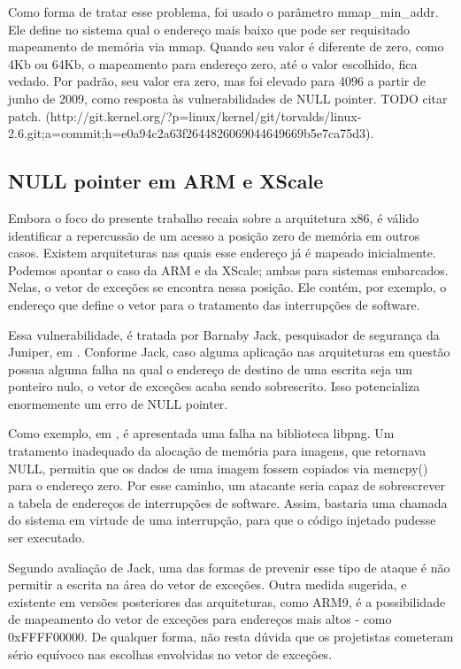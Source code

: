 			Como forma de tratar esse problema, foi usado o parâmetro mmap\_min\_addr.
			Ele define no sistema qual o endereço mais baixo que pode ser requisitado mapeamento
			de memória via mmap. Quando seu valor é diferente de zero, como 4Kb ou 64Kb,
			o mapeamento para endereço zero, até o valor escolhido, fica vedado.
			Por padrão, seu valor era zero, mas foi elevado para 4096 a partir de junho de 2009,
			como resposta às vulnerabilidades de NULL pointer.
			TODO citar patch.
	(http://git.kernel.org/?p=linux/kernel/git/torvalds/linux-2.6.git;a=commit;h=e0a94c2a63f2644826069044649669b5e7ca75d3). 
			
			
		\subsection{NULL pointer em ARM e XScale}
		\label{subsec:null_pointer_arm_xscale}
			Embora o foco do presente trabalho recaia sobre a arquitetura x86, é válido 
			identificar a repercussão de um acesso a posição zero de memória em outros casos.
			Existem arquiteturas nas quais esse endereço já é mapeado inicialmente. 
			Podemos apontar o caso da ARM e da XScale; ambas para sistemas embarcados. 
			Nelas, o vetor de exceções se encontra nessa posição. Ele contém, por exemplo,
			o endereço que define o vetor para o tratamento das interrupções de software.


			Essa vulnerabilidade, é tratada por Barnaby Jack, pesquisador de segurança da Juniper,
			em \cite{Jack2007}. Conforme Jack, caso alguma aplicação nas arquiteturas em questão
			possua alguma falha na qual o endereço de destino de uma escrita seja um ponteiro nulo,
			o vetor de exceções acaba sendo sobrescrito. Isso potencializa enormemente um erro
			de NULL pointer.


			Como exemplo, em \cite{Jack2007}, é apresentada uma falha na biblioteca libpng.
			Um tratamento inadequado da alocação de memória para imagens, que
			retornava NULL, permitia que os dados de uma imagem fossem copiados
			via memcpy() para o endereço zero. Por esse caminho, um atacante seria capaz
			de sobrescrever a tabela de endereços de interrupções de software.
			Assim, bastaria uma chamada do sistema em virtude de uma interrupção,
			para que o código injetado pudesse ser executado.

			
			Segundo avaliação de Jack, uma das formas de prevenir esse tipo de ataque é
			não permitir a escrita na área do vetor de exceções. Outra medida sugerida,
			e existente em versões posteriores das arquiteturas, como ARM9, é a possibilidade
			de mapeamento do vetor de exceções para endereços mais altos - como 0xFFFF00000.
			De qualquer forma, não resta dúvida que os projetistas cometeram sério
			equívoco nas escolhas envolvidas no vetor de exceções.
				
